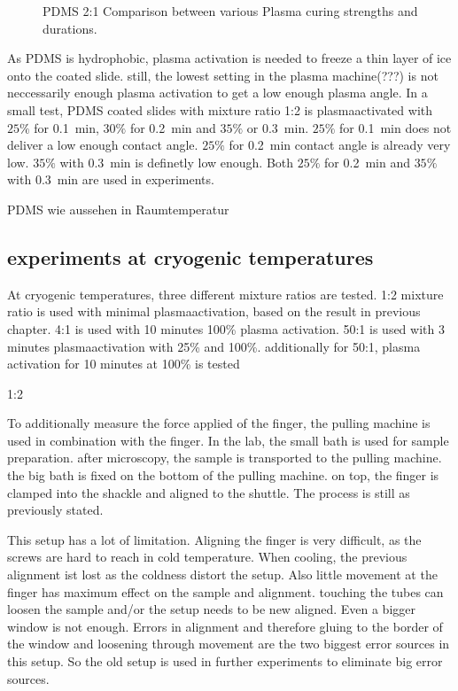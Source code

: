 \begin{figure}[hbt!]
	\centering
	
	\caption{PDMS 2:1 Comparison between various Plasma curing strengths and durations.}
	\label{fig:PlotPlasmaAktivierung}
\end{figure}

As PDMS is hydrophobic, plasma activation is needed to freeze a thin layer of ice onto the coated slide. still, the lowest setting in the plasma machine(???) is not neccessarily enough plasma activation to get a low enough plasma angle. In a small test, PDMS coated slides with mixture ratio 1:2 is plasmaactivated with $25\%$ for \SI{0.1}{\minute}, $30\%$ for \SI{0.2}{\minute} and $35\%$ or \SI{0.3}{\minute}. $25\%$ for \SI{0.1} {\minute} does not deliver a low enough contact angle. $25\%$ for \SI{0.2}{\minute} contact angle is already very low. $35\%$ with \SI{0.3}{\minute} is definetly low enough. Both $25\%$ for \SI{0.2}{\minute} and $35\%$ with \SI{0.3}{\minute} are used in experiments.

PDMS wie aussehen in Raumtemperatur



\FloatBarrier

\subsection{experiments at cryogenic temperatures}

At cryogenic temperatures, three different mixture ratios are tested. 1:2 mixture ratio is used with minimal plasmaactivation, based on the result in previous chapter. 4:1 is used with 10 minutes 100\% plasma activation. 50:1 is used with 3 minutes plasmaactivation with 25\% and 100\%. additionally for 50:1, plasma activation for 10 minutes at 100\% is tested

1:2

To additionally measure the force applied of the finger, the pulling machine is used in combination with the finger. In the lab, the small bath is used for sample preparation. after microscopy, the sample is transported to the pulling machine. the big bath is fixed on the bottom of the pulling machine. on top, the finger is clamped into the shackle and aligned to the shuttle. The process is still as previously stated. 

This setup has a lot of limitation. Aligning the finger is very difficult, as the screws are hard to reach in cold temperature. When cooling, the previous alignment ist lost as the coldness distort the setup. Also little movement at the finger has maximum effect on the sample and alignment. touching the tubes can loosen the sample and/or the setup needs to be new aligned. Even a bigger window is not enough. Errors in alignment and therefore gluing to the border of the window and loosening through movement are the two biggest error sources in this setup. So the old setup is used in further experiments to eliminate big error sources.


